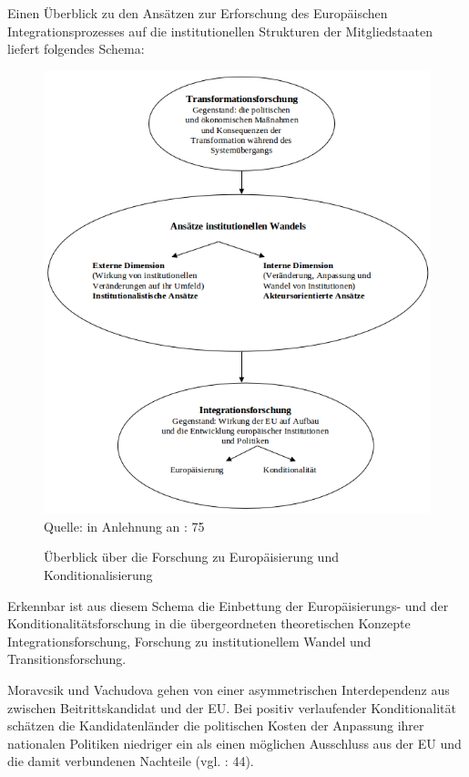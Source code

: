 Einen Überblick zu den Ansätzen zur Erforschung des Europäischen Integrationsprozesses auf die institutionellen Strukturen der Mitgliedstaaten liefert folgendes Schema:
\begin{figure}[H]
\setlength\belowcaptionskip{10pt}
 \centering
\caption{ Überblick über die Forschung zu Europäisierung und Konditionalisierung}
 
  \includegraphics[width=5in]{Material/ForschungZuEuropUndKondi_ohneRand}\\

Quelle: in Anlehnung an \cite{huszak} : 75
  \end{figure}
Erkennbar ist aus diesem Schema die Einbettung der Europäisierungs- und der Konditionalitätsforschung in die übergeordneten theoretischen Konzepte Integrationsforschung, Forschung zu institutionellem Wandel und Transitionsforschung.\par
Moravcsik und Vachudova gehen von einer asymmetrischen Interdependenz aus zwischen Beitrittskandidat und der EU. Bei positiv verlaufender Konditionalität schätzen die Kandidatenländer die politischen Kosten der Anpassung ihrer nationalen Politiken niedriger ein als einen möglichen Ausschluss aus der EU und die damit verbundenen Nachteile (vgl. \cite{morvac} : 44).

